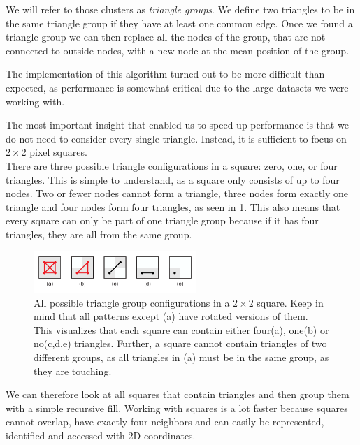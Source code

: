 We will refer to those clusters as \emph{triangle groups}. We define two triangles to be in the same triangle group if they have at least one common edge. Once we found a triangle group we can then replace all the nodes of the group, that are not connected to outside nodes, with a new node at the mean position of the group.

The implementation of this algorithm turned out to be more difficult than expected, as performance is somewhat critical due to the large datasets we were working with.

The most important insight that enabled us to speed up performance is that we do not need to consider every single triangle. Instead, it is sufficient to focus on $2\times2$ pixel squares.\\
There are three possible triangle configurations in a square: zero, one, or four triangles. This is simple to understand, as a square only consists of up to four nodes. Two or fewer nodes cannot form a triangle, three nodes form exactly one triangle and four nodes form four triangles, as seen in \cref{fig:triangleSquares}. This also means that every square can only be part of one triangle group because if it has four triangles, they are all from the same group.


\begin{figure}
  \centering
  \includegraphics[width=0.55\textwidth]{../assets/sampling/cluster_removal/cluster_quads.pdf}
  \caption[All possible triangle group configurations in a $2\times2$ square]{All possible triangle group configurations in a $2\times2$ square. Keep in mind that all patterns except (a) have rotated versions of them. This visualizes that each square can contain either four(a), one(b) or no(c,d,e) triangles. Further, a square cannot contain triangles of two different groups, as all triangles in (a) must be in the same group, as they are touching.}
  \label{fig:triangleSquares}
\end{figure}

We can therefore look at all squares that contain triangles and then group them with a simple recursive fill. Working with squares is a lot faster because squares cannot overlap, have exactly four neighbors and can easily be represented, identified and accessed with 2D coordinates.

